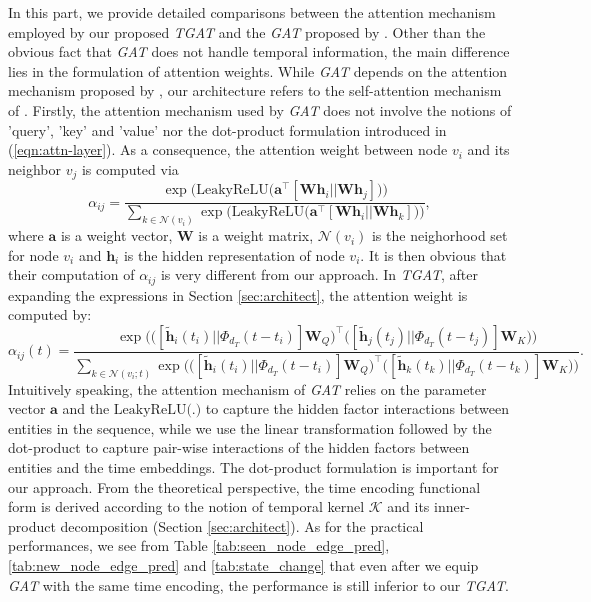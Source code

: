 \documentclass{article} %
\newcommand{\Wbf}{\mathbf{W}}
\newcommand{\hbf}{\mathbf{h}}
\begin{document}
In this part, we provide detailed comparisons between the attention mechanism employed by our proposed \textsl{TGAT} and the \textsl{GAT} proposed by \cite{velivckovic2017graph}. Other than the obvious fact that \textsl{GAT} does not handle temporal information, the main difference lies in the formulation of attention weights. While \textsl{GAT} depends on the attention mechanism proposed by \cite{bahdanau2014neural}, our architecture refers to the self-attention mechanism of \cite{vaswani2017attention}. Firstly, the attention mechanism used by \textsl{GAT} does not involve the notions of 'query', 'key' and 'value' nor the dot-product formulation introduced in (\ref{eqn:attn-layer}). As a consequence, the attention weight between node $v_i$ and its neighbor $v_j$ is computed via
\[
\alpha_{ij} = \frac{\exp \Big(\text{LeakyReLU}\big(\mathbf{a}^{\intercal} [\Wbf \mathbf{h}_i || \Wbf \mathbf{h}_j]\big)  \Big)}{\sum_{k \in \mathcal{N}(v_i)} \exp \Big(\text{LeakyReLU}\big(\mathbf{a}^{\intercal} [\Wbf \mathbf{h}_i || \Wbf \mathbf{h}_k]\big)  \Big)},
\]
where $\mathbf{a}$ is a weight vector, $\Wbf$ is a weight matrix, $\mathcal{N}(v_i)$ is the neighorhood set for node $v_i$ and $\mathbf{h}_i$ is the hidden representation of node $v_i$. It is then obvious that their computation of $\alpha_{ij}$ is very different from our approach. In \textsl{TGAT}, after expanding the expressions in Section \ref{sec:architect}, the attention weight is computed by:
\[
\alpha_{ij}(t) = \frac{\exp \Big( \big( [\tilde{\hbf}_i(t_i)||\Phi_{d_T}(t-t_i)]\Wbf_Q \big)^{\intercal} \big( [\tilde{\hbf}_j(t_j)||\Phi_{d_T}(t-t_j)]\Wbf_K \big) \Big)}{\sum_{k \in \mathcal{N}(v_i;t)} \exp \Big( \big( [\tilde{\hbf}_i(t_i)||\Phi_{d_T}(t-t_i)]\Wbf_Q \big)^{\intercal} \big( [\tilde{\hbf}_k(t_k)||\Phi_{d_T}(t-t_k)]\Wbf_K \big) \Big)}.
\]
Intuitively speaking, the attention mechanism of \textsl{GAT} relies on the parameter vector $\mathbf{a}$ and the $\text{LeakyReLU(.)}$ to capture the hidden factor interactions between entities in the sequence, while we use the linear transformation followed by the dot-product to capture pair-wise interactions of the hidden factors between entities and the time embeddings. The dot-product formulation is important for our approach. From the theoretical perspective, the time encoding functional form is derived according to the notion of temporal kernel $\mathcal{K}$ and its inner-product decomposition (Section \ref{sec:architect}). As for the practical performances, we see from Table \ref{tab:seen_node_edge_pred}, \ref{tab:new_node_edge_pred} and \ref{tab:state_change} that even after we equip \textsl{GAT} with the same time encoding, the performance is still inferior to our \textsl{TGAT}.
\end{document}
